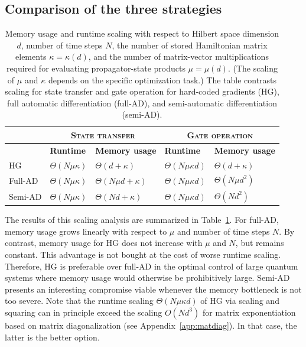 \subsection{Comparison of the three strategies}
\label{sec:scaling_comparison}

\begin{table}[t]
\renewcommand{\arraystretch}{1.5}
\centering
\caption[Runtime and memory scaling for HG, full-AD, and semi-AD.]{Memory usage and runtime scaling with respect to Hilbert space dimension $d$, number of time steps $N$, the number of stored Hamiltonian matrix elements $\kappa=\kappa(d)$, and the number of matrix-vector multiplications required for evaluating propagator-state products $\mu=\mu(d)$. (The scaling of $\mu$ and $\kappa$ depends on the specific optimization task.) The table contrasts scaling for state transfer and gate operation for hard-coded gradients (HG), full automatic differentiation (full-AD), and semi-automatic differentiation (semi-AD).}
\label{tab:scalingtable}
\begin{tabular}
{p{}p{}p{}p{}p{}}
\hline
\hline
& \multicolumn{2}{c}{\textbf{\textsc{State transfer}}} & \multicolumn{2}{c}{\textbf{\textsc{Gate operation}}}\\
\hline
& \textbf{Runtime} & \textbf{Memory usage} & \textbf{Runtime} & \textbf{Memory usage}
\\
\hline
HG & $\Theta(N\mu \kappa)$ & $\Theta(d+\kappa)$ & $\Theta(N\mu \kappa d)$ & $\Theta(d+\kappa)$\\
Full-AD & $\Theta(N\mu \kappa)$ & $\Theta(N\mu d+\kappa)$ & $\Theta(N\mu \kappa d)$ & $\Theta(N\mu d^2)$  \\
Semi-AD & $\Theta(N\mu \kappa)$ & $\Theta(Nd+\kappa)$ & $\Theta(N\mu \kappa d)$ & $\Theta(Nd^2)$\\
\hline \hline
\end{tabular}
\end{table}

The results of this scaling analysis are summarized in Table~\ref{tab:scalingtable}. For full-AD, memory usage grows linearly with respect to $\mu$ and number of time steps $N$. By contrast, memory usage for HG does not increase with $\mu$ and $N$, but remains constant. This advantage is not bought at the cost of worse runtime scaling. Therefore, HG is preferable over full-AD in the optimal control of large quantum systems where memory usage would otherwise be prohibitively large. Semi-AD presents an interesting compromise viable whenever the memory bottleneck is not too severe. Note that the runtime scaling $\Theta(N\mu\kappa d)$ of HG via scaling and squaring can in principle exceed the scaling $O(Nd^3)$ for matrix exponentiation based on matrix diagonalization (see Appendix~\ref{app:matdiag}). In that case, the latter is the better option.

